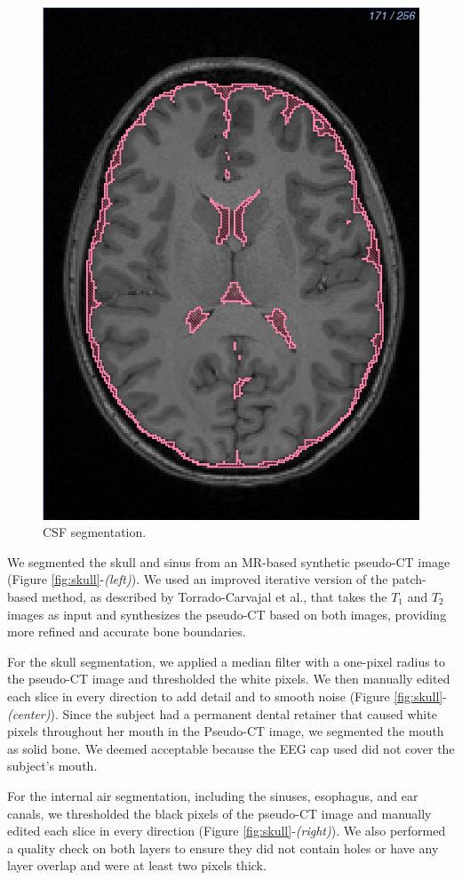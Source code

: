 \begin{figure}[H]
\begin{center}
\includegraphics[width=.49\textwidth]{Figures/CSF_seg}
\caption{CSF segmentation.}
\label{fig:csf}
\end{center}
\end{figure}

We segmented the skull and sinus from an MR-based synthetic pseudo-CT image (Figure \ref{fig:skull}-\textit{(left)}). We used an improved iterative version of the patch-based method, as described by Torrado-Carvajal et al., \cite{ref:pseudoct} that takes the $T_1$ and $T_2$ images as input and synthesizes the pseudo-CT based on both images, providing more refined and accurate bone boundaries.

For the skull segmentation, we applied a median filter with a one-pixel radius to the pseudo-CT image and thresholded the white pixels. We then manually edited each slice in every direction to add detail and to smooth noise (Figure \ref{fig:skull}-\textit{(center)}). Since the subject had a permanent dental retainer that caused white pixels throughout her mouth in the Pseudo-CT image, we segmented the mouth as solid bone. We deemed acceptable because the EEG cap used did not cover the subject's mouth. 

For the internal air segmentation, including the sinuses, esophagus, and ear canals, we thresholded the black pixels of the pseudo-CT image and manually edited each slice in every direction (Figure \ref{fig:skull}-\textit{(right)}). We also performed a quality check on both layers to ensure they did not contain holes or have any layer overlap and were at least two pixels thick.

